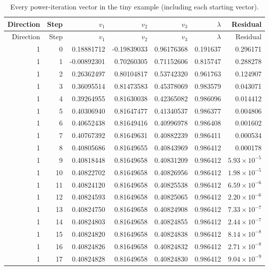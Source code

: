 \documentclass[11pt]{article}
\renewcommand{\arraystretch}{1.15}
\begin{document}
{\footnotesize\renewcommand{\arraystretch}{1}
\begin{longtable}{rrrrrrr}
\caption{Every power-iteration vector in the tiny example (including each starting vector).}\\
\toprule
Direction & Step & $v_1$ & $v_2$ & $v_3$ & $\lambda$ & Residual \\ \midrule\endfirsthead
\toprule
Direction & Step & $v_1$ & $v_2$ & $v_3$ & $\lambda$ & Residual \\ \midrule\endhead
1 & 0 & 0.18881712 & -0.19839033 & 0.96176368 & 0.191637 & 0.296171 \\
1 & 1 & -0.00892301 & 0.70260305 & 0.71152606 & 0.815747 & 0.288278 \\
1 & 2 & 0.26362497 & 0.80104817 & 0.53742320 & 0.961763 & 0.124907 \\
1 & 3 & 0.36095514 & 0.81473583 & 0.45378069 & 0.983579 & 0.043071 \\
1 & 4 & 0.39264955 & 0.81630038 & 0.42365082 & 0.986096 & 0.014412 \\
1 & 5 & 0.40306940 & 0.81647477 & 0.41340537 & 0.986377 & 0.004806 \\
1 & 6 & 0.40652438 & 0.81649416 & 0.40996978 & 0.986408 & 0.001602 \\
1 & 7 & 0.40767392 & 0.81649631 & 0.40882239 & 0.986411 & 0.000534 \\
1 & 8 & 0.40805686 & 0.81649655 & 0.40843969 & 0.986412 & 0.000178 \\
1 & 9 & 0.40818448 & 0.81649658 & 0.40831209 & 0.986412 & $5.93\times10^{-5}$ \\
1 & 10 & 0.40822702 & 0.81649658 & 0.40826956 & 0.986412 & $1.98\times10^{-5}$ \\
1 & 11 & 0.40824120 & 0.81649658 & 0.40825538 & 0.986412 & $6.59\times10^{-6}$ \\
1 & 12 & 0.40824593 & 0.81649658 & 0.40825065 & 0.986412 & $2.20\times10^{-6}$ \\
1 & 13 & 0.40824750 & 0.81649658 & 0.40824908 & 0.986412 & $7.33\times10^{-7}$ \\
1 & 14 & 0.40824803 & 0.81649658 & 0.40824855 & 0.986412 & $2.44\times10^{-7}$ \\
1 & 15 & 0.40824820 & 0.81649658 & 0.40824838 & 0.986412 & $8.14\times10^{-8}$ \\
1 & 16 & 0.40824826 & 0.81649658 & 0.40824832 & 0.986412 & $2.71\times10^{-8}$ \\
1 & 17 & 0.40824828 & 0.81649658 & 0.40824830 & 0.986412 & $9.04\times10^{-9}$ \\

\end{longtable}}
\end{document}
